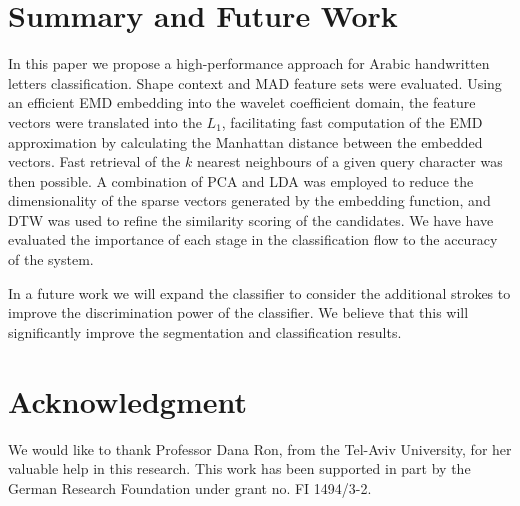 \documentclass[10pt, conference, compsocconf]{IEEEtran}
\begin{document}
\section{Summary and Future Work}
\label{sec:summary_future_work}
In this paper we propose a high-performance approach for Arabic handwritten letters classification.
Shape context and MAD feature sets were evaluated. 
Using an efficient EMD embedding into the wavelet coefficient domain, the feature vectors were translated into the $L_1$, facilitating fast computation of the EMD approximation by calculating the Manhattan distance between the embedded vectors.
Fast retrieval of the $k$ nearest neighbours of a given query character was then possible.
A combination of PCA and LDA was employed to reduce the dimensionality of the sparse vectors generated by the embedding function, and DTW was used to refine the similarity scoring of the candidates.
We have have evaluated the importance of each stage in the classification flow to the accuracy of the system.


In a future work we will expand the classifier to consider the additional strokes to improve the discrimination power of the classifier. 
We believe that this will significantly improve the segmentation and classification results.

\section*{Acknowledgment}
We would like to thank Professor Dana Ron, from the Tel-Aviv University, for her valuable help in this research. 
This work has been supported in part by the German Research Foundation under grant no. FI 1494/3-2.




\end{document}
